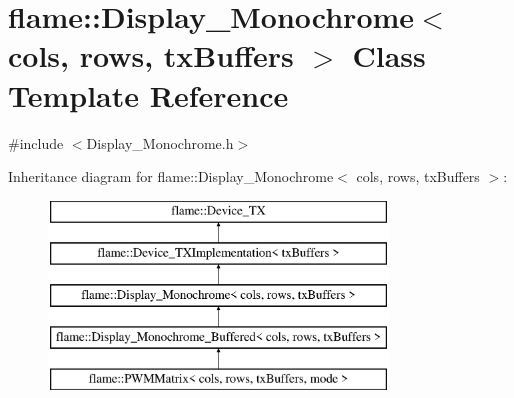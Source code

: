 \hypertarget{classflame_1_1_display___monochrome}{\section{flame\-:\-:Display\-\_\-\-Monochrome$<$ cols, rows, tx\-Buffers $>$ Class Template Reference}
\label{classflame_1_1_display___monochrome}
}


{\ttfamily \#include $<$Display\-\_\-\-Monochrome.\-h$>$}

Inheritance diagram for flame\-:\-:Display\-\_\-\-Monochrome$<$ cols, rows, tx\-Buffers $>$\-:\begin{figure}[H]
\begin{center}
\leavevmode
\includegraphics[height=5.000000cm]{classflame_1_1_display___monochrome}
\end{center}
\end{figure}

